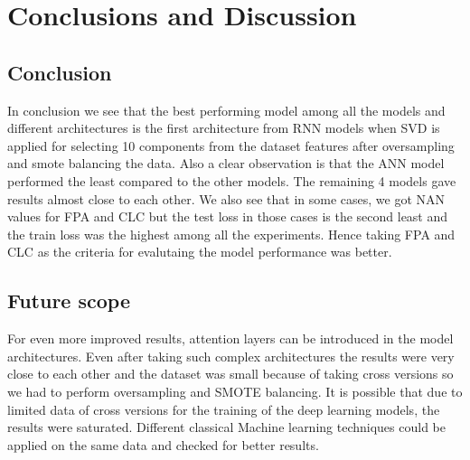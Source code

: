 \chapter{Conclusions and Discussion}\label{final}

\section{Conclusion}

In conclusion we see that the best performing model among all the models and different architectures is the first architecture from RNN models when SVD is applied for selecting 10 components from the dataset features after oversampling and smote balancing the data. Also a clear observation is that the ANN model performed the least compared to the other models. The remaining 4 models gave results almost close to each other. We also see that in some cases, we got NAN values for FPA and CLC but the test loss in those cases is the second least and the train loss was the highest among all the experiments. Hence taking FPA and CLC as the criteria for evalutaing the model performance was better. 

\section{Future scope}
For even more improved results, attention layers can be introduced in the model architectures. Even after taking such complex architectures the results were very close to each other and the dataset was small because of taking cross versions so we had to perform oversampling and SMOTE balancing. It is possible that due to limited data of cross versions for the training of the deep learning models, the results were saturated. Different classical Machine learning techniques could be applied on the same data and checked for better results.